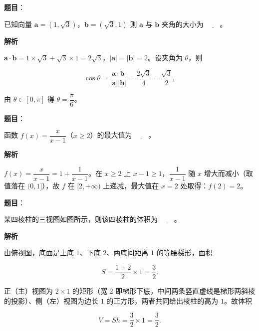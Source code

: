 \begin{answer}

\textbf{题目}：

已知向量 \(\boldsymbol{a}=(1,\sqrt{3})\)，\(\boldsymbol{b}=(\sqrt{3},1)\) 则 \(\boldsymbol{a}\) 与 \(\boldsymbol{b}\) 夹角的大小为 \(\underline{\qquad}\)。

\textbf{解析}

\(\boldsymbol{a}\cdot\boldsymbol{b}=1\times\sqrt{3}+\sqrt{3}\times1=2\sqrt{3}\)，\(|\boldsymbol{a}|=|\boldsymbol{b}|=2\)。设夹角为 \(\theta\)，则

\nopagebreak[4]
\[
\cos\theta=\frac{\boldsymbol{a}\cdot\boldsymbol{b}}{|\boldsymbol{a}||\boldsymbol{b}|}=\frac{2\sqrt{3}}{4}=\frac{\sqrt{3}}{2},
\]

由 \(\theta\in[0,\pi]\) 得 \(\theta=\dfrac{\pi}{6}\)。


\end{answer}
\begin{answer}

\textbf{题目}：

函数 \(f(x)=\dfrac{x}{x-1}\)（\(x\geqslant 2\)）的最大值为 \(\underline{\qquad}\)。

\textbf{解析}

\(f(x)=\dfrac{x}{x-1}=1+\dfrac{1}{x-1}\)。在 \(x\geqslant2\) 上 \(x-1\geqslant1\)，\(\dfrac{1}{x-1}\) 随 \(x\) 增大而减小（取值落在 \((0,1]\)），故 \(f\) 在 \([2,+\infty)\) 上递减，最大值在 \(x=2\) 处取得：\(f(2)=2\)。


\end{answer}
\begin{answer}

\textbf{题目}：

某四棱柱的三视图如图所示，则该四棱柱的体积为 \(\underline{\qquad}\)。
\nopagebreak[4]
\begin{center}\end{center}
\nopagebreak[4]
\textbf{解析}

由俯视图，底面是上底 \(1\)、下底 \(2\)、两底间距离 \(1\) 的等腰梯形，面积

\nopagebreak[4]
\[
S=\frac{1+2}{2}\times1=\frac{3}{2}.
\]

正（主）视图为 \(2\times1\) 的矩形（宽 \(2\) 即梯形下底，中间两条竖直虚线是梯形两斜棱的投影）、侧（左）视图为边长 \(1\) 的正方形，两者共同给出棱柱的高为 \(1\)。故体积

\nopagebreak[4]
\[
V=Sh=\frac{3}{2}\times1=\frac{3}{2}.
\]


\end{answer}
